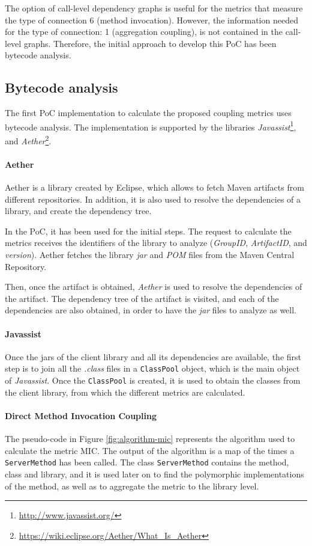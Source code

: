 The option of call-level dependency graphs is useful for the metrics that measure the type of connection 6 (method invocation). However, the information needed for the type of connection: 1 (aggregation coupling), is not contained in the call-level graphs. Therefore, the initial approach to develop this PoC has been bytecode analysis.

\subsection{Bytecode analysis}
The first PoC implementation to calculate the proposed coupling metrics uses bytecode analysis. The implementation is supported by the libraries \textit{Javassist}\footnote{\url{http://www.javassist.org/}}, and \textit{Aether}\footnote{\url{https://wiki.eclipse.org/Aether/What_Is_Aether}}.

\paragraph{Aether}
Aether is a library created by Eclipse, which allows to fetch Maven artifacts from different repositories. In addition, it is also used to resolve the dependencies of a library, and create the dependency tree.

In the PoC, it has been used for the initial steps. The request to calculate the metrics receives the identifiers of the library to analyze (\textit{GroupID}, \textit{ArtifactID}, and \textit{version}). Aether fetches the library \textit{jar} and \textit{POM} files from the Maven Central Repository.

Then, once the artifact is obtained, \textit{Aether} is used to resolve the dependencies of the artifact. The dependency tree of the artifact is visited, and each of the dependencies are also obtained, in order to have the \textit{jar} files to analyze as well.

\paragraph{Javassist}
Once the jars of the client library and all its dependencies are available, the first step is to join all the \textit{.class} files in a \texttt{ClassPool} object, which is the main object of \textit{Javassist}. Once the \texttt{ClassPool} is created, it is used to obtain the classes from the client library, from which the different metrics are calculated.

\paragraph{Direct Method Invocation Coupling} %
The pseudo-code in Figure \ref{fig:algorithm-mic} represents the algorithm used to calculate the metric MIC. The output of the algorithm is a map of the times a \texttt{ServerMethod} has been called. The class \texttt{ServerMethod} contains the method, class and library, and it is used later on to find the polymorphic implementations of the method, as well as to aggregate the metric to the library level.

